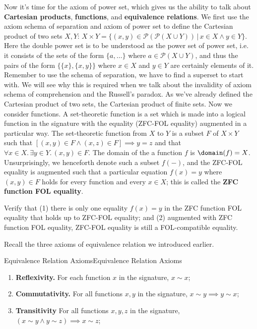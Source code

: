 \documentclass[../main.tex]{subfiles}
\begin{document}
Now it's time for the axiom of power set, which gives us the ability to talk about \textbf{Cartesian products}, \textbf{functions}, and \textbf{equivalence relations}. We first use the axiom schema of separation and axiom of power set to define the Cartesian product of two sets $X, Y$: $X\times Y=\{(x,y)\in \mathcal{P}(\mathcal{P}(X\cup Y))\,|\,x\in X\land y\in Y\}$. Here the double power set is to be understood as the power set of power set, i.e. it consists of the sets of the form $\{a,\dots\}$ where $a\in\mathcal{P}(X\cup Y)$, and thus the pairs of the form $\{\{x\},\{x,y\}\}$ where $x\in X$ and $y\in Y$ are certainly elements of it. Remember to use the schema of separation, we have to find a superset to start with. We will see why this is required when we talk about the invalidity of axiom schema of comprehension and the Russell's paradox. As we've already defined the Cartesian product of two sets, the Cartesian product of finite sets. Now we consider functions. A set-theoretic function is a set which is made into a logical function in the signature with the equality (ZFC-FOL equality) augmented in a particular way. The set-theoretic function from $X$ to $Y$ is a subset $F$ of $X\times Y$ such that $[(x,y)\in F\land(x,z)\in F]\implies y=z$ and that $\forall x\in X.\,\exists y\in Y.\,(x,y)\in F$. The domain of the a function $f$ is $\domain(f)=X$. Unsurprisingly, we henceforth denote such a subset $f(-)$, and the ZFC-FOL equality is augmented such that a particular equation $f(x)=y$ where $(x,y)\in F$ holds for every function and every $x\in X$; this is called the \textbf{ZFC function FOL equality}.
\begin{exercise}
Verify that (1) there is only one equality $f(x)=y$ in the ZFC function FOL equality that holds up to ZFC-FOL equality; and (2) augmented with ZFC function FOL equality, ZFC-FOL equality is still a FOL-compatible equality.
\end{exercise}
Recall the three axioms of equivalence relation we introduced earlier.
\begin{axiom}{Equivalence Relation Axioms}{Equivalence Relation Axioms}
\begin{enumerate}
    \item \textbf{Reflexivity.}  For each function $x$ in the signature, $x\sim x$;
    \item \textbf{Commutativity.}  For all functions $x,y$ in the signature, $x\sim y\implies y\sim x$;
    \item \textbf{Transitivity}  For all functions $x,y,z$ in the signature, $(x\sim y\land y\sim z)\implies x\sim z$;
\end{enumerate}
\end{axiom}
\end{document}
